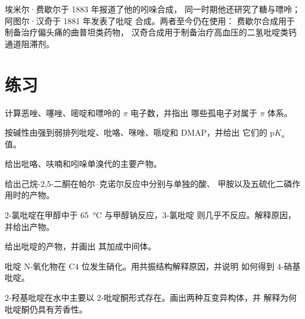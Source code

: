 \begin{history}[两种经典的成环合成]
埃米尔·费歇尔于 1883 年报道了他的吲哚合成，
同一时期他还研究了糖与嘌呤；阿图尔·汉奇于 1881 年发表了吡啶
合成。两者至今仍在使用：
费歇尔合成用于制备治疗偏头痛的曲普坦类药物，
汉奇合成用于制备治疗高血压的二氢吡啶类钙通道阻滞剂。
\end{history}

\section{练习}

\begin{exercise}[$\star$]\label{exo:b3:heterocycles:1}
计算恶唑、噻唑、嘧啶和嘌呤的 $\pi$ 电子数，并指出
哪些孤电子对属于 $\pi$ 体系。
\end{exercise}

\begin{exercise}[$\star$]\label{exo:b3:heterocycles:2}
按碱性由强到弱排列吡啶、吡咯、咪唑、哌啶和 DMAP，并给出
它们的 $\mathrm pK_a$ 值。
\end{exercise}

\begin{exercise}[$\star$]\label{exo:b3:heterocycles:3}
给出吡咯、呋喃和吲哚单溴代的主要产物。
\end{exercise}

\begin{exercise}[$\star$]\label{exo:b3:heterocycles:4}
给出己烷-2,5-二酮在帕尔–克诺尔反应中分别与单独的酸、
甲胺以及五硫化二磷作用时的产物。
\end{exercise}

\begin{exercise}[$\star\star$]\label{exo:b3:heterocycles:5}
2-氯吡啶在甲醇中于 \qty{65}{\celsius} 与甲醇钠反应，3-氯吡啶
则几乎不反应。解释原因，并给出产物。
\end{exercise}

\begin{exercise}[$\star\star$]\label{exo:b3:heterocycles:6}
给出吡啶的产物，并画出
其加成中间体。
\end{exercise}

\begin{exercise}[$\star\star$]\label{exo:b3:heterocycles:7}
吡啶 N-氧化物在 C4 位发生硝化。用共振结构解释原因，并说明
如何得到 4-硝基吡啶。
\end{exercise}

\begin{exercise}[$\star\star$]\label{exo:b3:heterocycles:8}
2-羟基吡啶在水中主要以 2-吡啶酮形式存在。画出两种互变异构体，并
解释为何吡啶酮仍具有芳香性。
\end{exercise}

